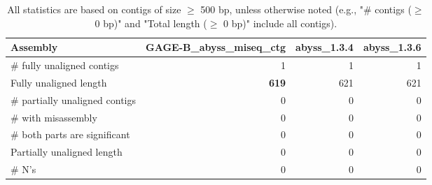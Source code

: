 \documentclass[12pt,a4paper]{article}
\begin{document}
\begin{table}[ht]
\begin{center}
\caption{All statistics are based on contigs of size $\geq$ 500 bp, unless otherwise noted (e.g., "\# contigs ($\geq$ 0 bp)" and "Total length ($\geq$ 0 bp)" include all contigs).}
\begin{tabular}{|l*{3}{|r}|}
\hline
Assembly & GAGE-B\_abyss\_miseq\_ctg & abyss\_1.3.4 & abyss\_1.3.6 \\ \hline
\# fully unaligned contigs & 1 & 1 & 1 \\ \hline
Fully unaligned length & {\bf 619} & 621 & 621 \\ \hline
\# partially unaligned contigs & 0 & 0 & 0 \\ \hline
\hspace{5mm}\# with misassembly & 0 & 0 & 0 \\ \hline
\hspace{5mm}\# both parts are significant & 0 & 0 & 0 \\ \hline
Partially unaligned length & 0 & 0 & 0 \\ \hline
\# N's & 0 & 0 & 0 \\ \hline
\end{tabular}
\end{center}
\end{table}
\end{document}
